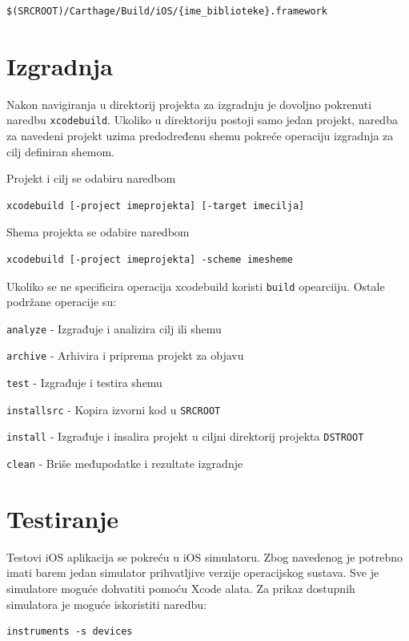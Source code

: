 \documentclass[times, utf8, diplomski, numeric]{fer}
\begin{document}
\begin{appendices}
\begin{verbatim}
$(SRCROOT)/Carthage/Build/iOS/{ime_biblioteke}.framework
\end{verbatim}


\section{Izgradnja}

Nakon navigiranja u direktorij projekta za izgradnju je dovoljno pokrenuti naredbu \verb|xcodebuild|. Ukoliko u direktoriju postoji samo jedan projekt, naredba za navedeni projekt uzima predodređenu shemu pokreće operaciju izgradnja za cilj definiran shemom.

Projekt i cilj se odabiru naredbom
\begin{verbatim}
xcodebuild [-project imeprojekta] [-target imecilja]
\end{verbatim}

Shema projekta se odabire naredbom
\begin{verbatim}
xcodebuild [-project imeprojekta] -scheme imesheme
\end{verbatim}

Ukoliko se ne specificira operacija xcodebuild koristi \verb|build| opearciiju. Ostale podržane operacije su:

\verb|analyze| - Izgrađuje i analizira cilj ili shemu

\verb|archive| - Arhivira i priprema projekt za objavu

\verb|test| - Izgrađuje i testira shemu

\verb|installsrc| - Kopira izvorni kod u \verb|SRCROOT|

\verb|install| - Izgrađuje i insalira projekt u ciljni direktorij projekta \verb|DSTROOT|

\verb|clean| - Briše međupodatke i rezultate izgradnje

\section{Testiranje}

Testovi iOS aplikacija se pokreću u iOS simulatoru. Zbog navedenog je potrebno imati barem jedan simulator prihvatljive verzije operacijskog sustava. Sve je simulatore moguće dohvatiti pomoću Xcode alata. Za prikaz dostupnih simulatora je moguće iskoristiti naredbu:
\begin{verbatim}
instruments -s devices
\end{verbatim}


\end{appendices}
\end{document}
